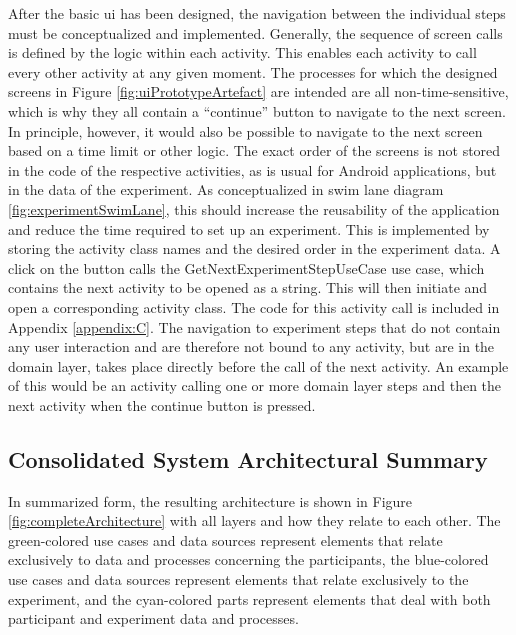  After the basic \ac{ui} has been designed, the navigation between the individual steps must be conceptualized and implemented. Generally, the sequence of screen calls is defined by the logic within each activity. This enables each activity to call every other activity at any given moment. The processes for which the designed screens in Figure \ref{fig:uiPrototypeArtefact} are intended are all non-time-sensitive, which is why they all contain a \enquote{continue} button to navigate to the next screen. In principle, however, it would also be possible to navigate to the next screen based on a time limit or other logic. The exact order of the screens is not stored in the code of the respective activities, as is usual for Android applications, but in the data of the experiment. As conceptualized in swim lane diagram \ref{fig:experimentSwimLane}, this should increase the reusability of the application and reduce the time required to set up an experiment. This is implemented by storing the activity class names and the desired order in the experiment data. A click on the button calls the GetNextExperimentStepUseCase use case, which contains the next activity to be opened as a string. This will then initiate and open a corresponding activity class. The code for this activity call is included in Appendix \ref{appendix:C}. The navigation to experiment steps that do not contain any user interaction and are therefore not bound to any activity, but are in the domain layer, takes place directly before the call of the next activity. An example of this would be an activity calling one or more domain layer steps and then the next activity when the continue button is pressed.

\subsection{Consolidated System Architectural Summary}\label{subsec:completeArchitecture}

In summarized form, the resulting architecture is shown in Figure \ref{fig:completeArchitecture} with all layers and how they relate to each other. The green-colored use cases and data sources represent elements that relate exclusively to data and processes concerning the participants, the blue-colored use cases and data sources represent elements that relate exclusively to the experiment, and the cyan-colored parts represent elements that deal with both participant and experiment data and processes.

